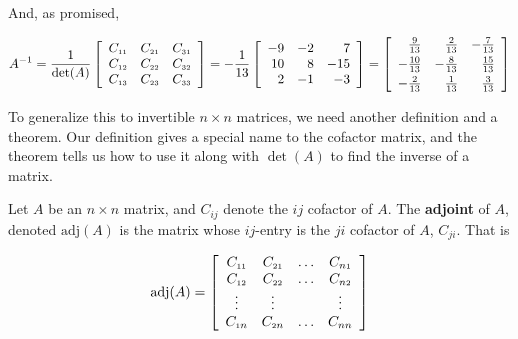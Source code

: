 And, as promised,

\[ A^{-1} = \dfrac{1}{\det(A)} \left[ \begin{array}{ccc} C_{\mbox{\tiny$11$}} & C_{\mbox{\tiny$21$}} & C_{\mbox{\tiny$31$}} \\ C_{\mbox{\tiny$12$}} & C_{\mbox{\tiny$22$}} & C_{\mbox{\tiny$32$}} \\ C_{\mbox{\tiny$13$}} & C_{\mbox{\tiny$23$}} & C_{\mbox{\tiny$33$}} \\ \end{array} \right] = -\dfrac{1}{13} \left[ \begin{array}{rrr} -9 & -2 & 7\\ 10 & 8 & -15 \\ 2  &  -1 &  -3 \\ \end{array} \right]  =  \left[ \begin{array}{rrr} \frac{9}{13} & \frac{2}{13} & -\frac{7}{13} \\[3pt] -\frac{10}{13} & -\frac{8}{13} & \frac{15}{13} \\[3pt] -\frac{2}{13} & \frac{1}{13} & \frac{3}{13} \\ \end{array} \right] \]

To generalize this to invertible $n \times n$ matrices, we need another definition and a theorem.  Our definition gives a special name to the cofactor matrix, and the theorem tells us how to use it along with $\det(A)$ to find the inverse of a matrix.

\smallskip

\colorbox{ResultColor}{\bbm

\begin{defn}  \label{matrixadjoint} Let $A$ be an $n \times n$ matrix, and $C_{ij}$ denote the $ij$ cofactor of $A$.  The   \textbf{adjoint} of $A$, denoted $\text{adj}(A)$ is the matrix whose $ij$-entry is the $ji$ cofactor of $A$, $C_{ji}$.  That is

\[ \text{adj}(A) = \left[
\begin{array}{cccc} 
C_{\mbox{\tiny$11$}} & C_{\mbox{\tiny$21$}} & \ldots & C_{n\mbox{\tiny$1$}} \\  
C_{\mbox{\tiny$12$}} & C_{\mbox{\tiny$22$}} & \ldots & C_{n\mbox{\tiny$2$}} \\
   \vdots  & \vdots & & \vdots \\
C_{\mbox{\tiny$1$}n} & C_{\mbox{\tiny$2$}n} & \ldots & C_{nn} \\  \end{array} \right] \]


\end{defn}

\ebm}

